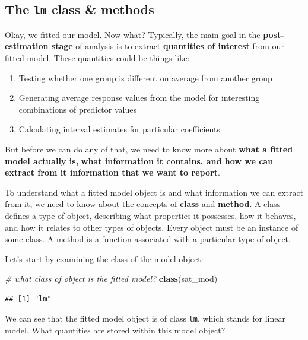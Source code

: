 \documentclass[
]{book}
\newenvironment{Shaded}{\begin{snugshade}}{\end{snugshade}}
\newcommand{\CommentTok}[1]{\textcolor[rgb]{0.56,0.35,0.01}{\textit{#1}}}
\newcommand{\KeywordTok}[1]{\textcolor[rgb]{0.13,0.29,0.53}{\textbf{#1}}}
\newcommand{\NormalTok}[1]{#1}
\providecommand{\tightlist}{%
  \setlength{\itemsep}{0pt}\setlength{\parskip}{0pt}}
\begin{document}
\hypertarget{the-lm-class-methods}{%
\subsection{\texorpdfstring{The \texttt{lm} class \& methods}{The lm class \& methods}}\label{the-lm-class-methods}}

Okay, we fitted our model. Now what? Typically, the main goal in the \textbf{post-estimation stage} of analysis
is to extract \textbf{quantities of interest} from our fitted model. These quantities could be things like:

\begin{enumerate}
\def\labelenumi{\arabic{enumi}.}
\tightlist
\item
  Testing whether one group is different on average from another group
\item
  Generating average response values from the model for interesting combinations of predictor values
\item
  Calculating interval estimates for particular coefficients
\end{enumerate}

But before we can do any of that, we need to know more about \textbf{what a fitted model actually is,}
\textbf{what information it contains, and how we can extract from it information that we want to report}.

To understand what a fitted model object is and what information we can extract from it, we need to know about the concepts of \textbf{class} and \textbf{method}. A class defines a type of object, describing what properties it possesses, how it behaves, and how it relates to other types of objects. Every object must be an instance of some class. A method is a function associated with a particular type of object.

Let's start by examining the class of the model object:

\begin{Shaded}
\begin{Highlighting}[]
  \CommentTok{\# what class of object is the fitted model?}
  \KeywordTok{class}\NormalTok{(sat\_mod)}
\end{Highlighting}
\end{Shaded}

\begin{verbatim}
## [1] "lm"
\end{verbatim}

We can see that the fitted model object is of class \texttt{lm}, which stands for linear model. What quantities are stored within this model object?
\end{document}
